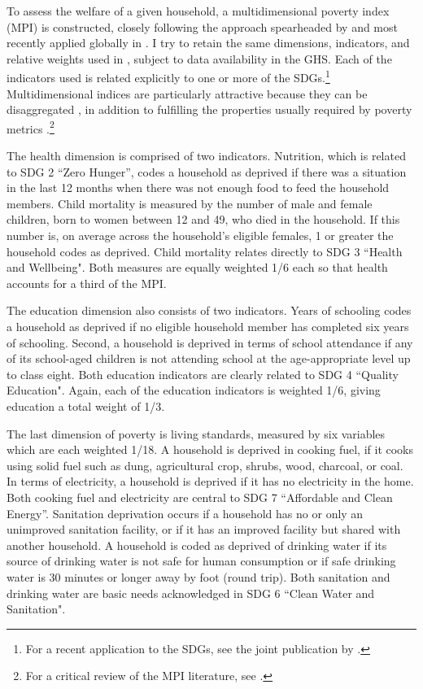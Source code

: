 \documentclass[a4paper,12pt]{article}
\theoremstyle{plain}
\theoremstyle{definition}
\theoremstyle{definition}
\theoremstyle{definition}
\theoremstyle{definition}
\begin{document}
To assess the welfare of a given household, a multidimensional poverty index (MPI) is constructed, closely following the approach spearheaded by \citet{alkire2011} and most recently applied globally in \citet{alkire2020}. I try to retain the same dimensions, indicators, and relative weights used in \citet{alkire2018, alkire2020}, subject to data availability in the GHS. Each of the indicators used is related explicitly to one or more of the SDGs.\footnote{For a recent application to the SDGs, see the joint publication by \citet{ophi2020}.} Multidimensional indices are particularly attractive because they can be disaggregated \citep{bourguignon2003, foster1984}, in addition to fulfilling the properties usually required by poverty metrics \citep[see][]{Sen1976}.\footnote{For a critical review of the MPI literature, see \citet{ravallion2011}.}

The health dimension is comprised of two indicators. Nutrition, which is related to SDG 2 ``Zero Hunger'', codes a household as deprived if there was a situation in the last 12 months when there was not enough food to feed the household members. Child mortality is measured by the number of male and female children, born to women between 12 and 49, who died in the household. If this number is, on average across the household's eligible females, 1 or greater the household codes as deprived. Child mortality relates directly to SDG 3 ``Health and Wellbeing". Both measures are equally weighted 1/6 each so that health accounts for a third of the MPI. 

The education dimension also consists of two indicators. Years of schooling codes a household as deprived if no eligible household member has completed six years of schooling. Second, a household is deprived in terms of school attendance if any of its school-aged children is not attending school at the age-appropriate level up to class eight. Both education indicators are clearly related to SDG 4 ``Quality Education". Again, each of the education indicators is weighted 1/6, giving education a total weight of 1/3.

The last dimension of poverty is living standards, measured by six variables which are each weighted 1/18. A household is deprived in cooking fuel, if it cooks using solid fuel such as dung, agricultural crop, shrubs, wood, charcoal, or coal. In terms of electricity, a household is deprived if it has no electricity in the home. Both cooking fuel and electricity are central to SDG 7 ``Affordable and Clean Energy''. Sanitation deprivation occurs if a household has no or only an unimproved sanitation facility, or if it has an improved facility but shared with another household. A household is coded as deprived of drinking water if its source of drinking water is not safe for human consumption or if safe drinking water is 30 minutes or longer away by foot (round trip). Both sanitation and drinking water are basic needs acknowledged in SDG 6 ``Clean Water and Sanitation".
\end{document}
